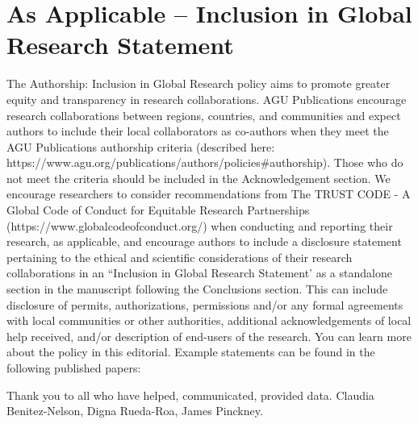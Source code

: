 \documentclass[draft]{agujournal2019}
\begin{document}
\section*{As Applicable – Inclusion in Global Research Statement}
The Authorship: Inclusion in Global Research policy aims to promote greater equity and transparency in research collaborations. AGU Publications encourage research collaborations between regions, countries, and communities and expect authors to include their local collaborators as co-authors when they meet the AGU Publications authorship criteria (described here: https://www.agu.org/publications/authors/policies\#authorship). Those who do not meet the criteria should be included in the Acknowledgement section. We encourage researchers to consider recommendations from The TRUST CODE - A Global Code of Conduct for Equitable Research Partnerships (https://www.globalcodeofconduct.org/) when conducting and reporting their research, as applicable, and encourage authors to include a disclosure statement pertaining to the ethical and scientific considerations of their research collaborations in an “Inclusion in Global Research Statement’ as a standalone section in the manuscript following the Conclusions section. This can include disclosure of permits, authorizations, permissions and/or any formal agreements with local communities or other authorities, additional acknowledgements of local help received, and/or description of end-users of the research. You can learn more about the policy in this editorial. Example statements can be found in the following published papers: 


\acknowledgments
Thank you to all who have helped, communicated, provided data. Claudia Benitez-Nelson, Digna Rueda-Roa, James Pinckney.



%
%
\end{document}
